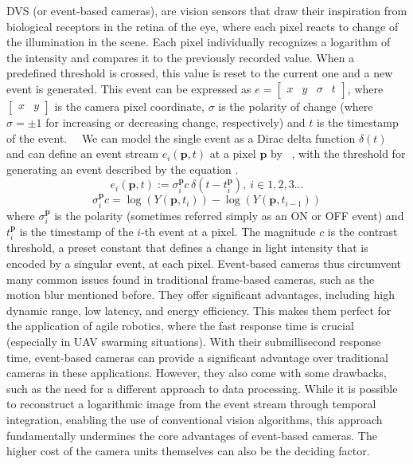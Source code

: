 \ac{DVS} (or event-based cameras), are vision sensors that draw their inspiration from biological receptors in the retina of the eye, where each pixel reacts
to change of the illumination in the scene. Each pixel individually recognizes a logarithm of the intensity and compares it to the previously
recorded value. When a predefined threshold is crossed, this value is reset to the current one and a new event is generated. This event can be expressed as $e = \begin{bmatrix} x & y & \sigma & t \end{bmatrix}$, where $\begin{bmatrix} x & y \end{bmatrix}$
is the camera pixel coordinate, $\sigma$ is the polarity of change (where $\sigma = \pm 1$ for increasing or decreasing change, respectively) and $t$ is the timestamp of the event.~\cite{gallego22event}~\cite{scheerlinck2018event} We can model the single event as a Dirac delta function $\delta(t)$ and can define an event stream
$e_i(\boldsymbol{p}, t)$ at a pixel $\boldsymbol{p}$ by ~\cite{scheerlinck2018event},
with the threshold for generating an event described by the equation .
\begin{equation}
e_i(\boldsymbol{p}, t) := \sigma_i^{\boldsymbol{p}} c \, \delta(t - t_i^{\boldsymbol{p}}), \ i \in 1, 2, 3 ...
\label{eq:event_eq}
\end{equation}
\begin{equation}
\sigma_i^{\boldsymbol{p}} c = \log(Y(\boldsymbol{p}, t_i)) - \log(Y(\boldsymbol{p}, t_{i-1}))
\label{eq:bias_eq}
\end{equation}
where $\sigma_i^{\boldsymbol{p}}$ is the polarity (sometimes referred simply as an ON or OFF event) and $t_i^{\boldsymbol{p}}$ is the timestamp of the $i$-th event at a pixel.
The magnitude $c$ is the contrast threshold, a preset constant that defines a change in light intensity that is encoded by a singular event, at each pixel. Event-based cameras thus circumvent many common issues found in traditional frame-based cameras, such as the motion blur mentioned before. They offer significant advantages, including high dynamic range, low latency,
and energy efficiency.
This makes them perfect for the application of agile robotics,
where the fast response time is crucial (especially in UAV swarming situations). With their submillisecond response time,
event-based cameras can provide a significant advantage over traditional cameras in these applications.
However, they also come with some drawbacks, such as the need for a different approach to
data processing. While it is possible to reconstruct a logarithmic image from the event stream through temporal integration,
enabling the use of conventional vision algorithms, this approach fundamentally undermines the core advantages of event-based cameras.
The higher cost of the camera units themselves can also be the deciding factor.~\cite{gallego22event}

